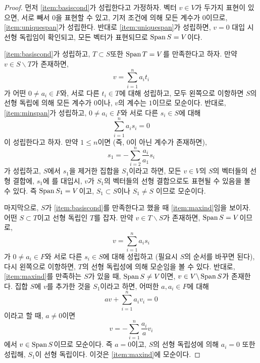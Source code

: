 \begin{proof}
    먼저 \ref{item:basiscond}가 성립한다고 가정하자.
    벡터 $v \in V$가 두가지 표현이 있으면, 서로 빼서 $0$을 표현할 수 있고, 기저 조건에 의해 모든 계수가 $0$이므로, \ref{item:uniquespan}가 성립한다.
    반대로 \ref{item:uniquespan}가 성립하면, $v = 0$ 대입 시 선형 독립임이 확인되고, 모든 벡터가 표현되므로 $\operatorname{Span} S = V$이다.

    \ref{item:basiscond}가 성립하고, $T \subset S$또한 $\operatorname{Span} T = V$를 만족한다고 하자.
    만약 $v \in S \backslash T$가 존재하면, 
    \begin{equation*}
        v = \sum_{i = 1}^n a_i t_i
    \end{equation*}
    가 어떤 $0 \neq a_i \in F$와, 서로 다른 $t_i \in T$에 대해 성립하고, 모두 왼쪽으로 이항하면 $S$의 선형 독립에 의해 모든 계수가 $0$이나, $v$의 계수는 $1$이므로 모순이다.
    반대로, \ref{item:minspan}가 성립하고, $0 \neq a_i \in F$와 서로 다른 $s_i \in S$에 대해
    \begin{equation*}
        \sum_{i = 1}^n a_i s_i = 0
    \end{equation*}
    이 성립한다고 하자.
    만약 $1 \leq n$이면 (즉, $0$이 아닌 계수가 존재하면),
    \begin{equation}
    \label{eq:nonuniqueexpressionvec}
        s_1 = -\sum_{i = 2}^n \frac{a_i}{a_1} s_i
    \end{equation}
    가 성립하고, $S$에서 $s_1$을 제거한 집합을 $S_1$이라고 하면, 모든 $v \in V$의 $S$의 벡터들의 선형 결합에, $s_1$에 를 대입시, $v$가 $S_1$의 벡터들의 선형 결합으로도 표현될 수 있음을 볼 수 있다.
    즉 $\operatorname{Span} S_1 = V$이고, $S_1 \subset S$이나 $S_1 \neq S$ 이므로 모순이다.

    마지막으로, $S$가 \ref{item:basiscond}를 만족한다고 했을 때 \ref{item:maxind}임을 보이자.
    어떤 $S \subset T$이고 선형 독립인 $T$를 잡자.
    만약 $v \in T \backslash S$가 존재하면, $\operatorname{Span} S = V$이므로,
    \begin{equation*}
        v = \sum_{i = 1}^n a_i s_i
    \end{equation*}
    가 $0 \neq a_i \in F$와 서로 다른 $s_i \in S$에 대해 성립하고 (필요시 $S$의 순서를 바꾸면 된다), 다시 왼쪽으로 이항하면, $T$의 선형 독립성에 의해 모순임을 볼 수 있다.
    반대로, \ref{item:maxind}를 만족하는 $S$가 있을 때, $\operatorname{Span} S \neq V$이면, $v \in V \backslash \operatorname{Span} S$가 존재한다.
    집합 $S$에 $v$를 추가한 것을 $S_1$이라고 하면, 어떠한 $a, a_i \in F$에 대해
    \begin{equation*}
        a v + \sum_{i = 1}^n a_i v_i = 0
    \end{equation*}
    이라고 할 때, $a \neq 0$이면
    \begin{equation*}
        v = - \sum_{i = 1}^n \frac{a_i}{a} v_i
    \end{equation*}
    에서 $v \in \operatorname{Span} S$이므로 모순이다.
    즉 $a = 0$이고, $S$의 선형 독립성에 의해 $a_i = 0$ 또한 성립해, $S_1$이 선형 독립이다.
    이것은 \ref{item:maxind}에 모순이다.
\end{proof}

